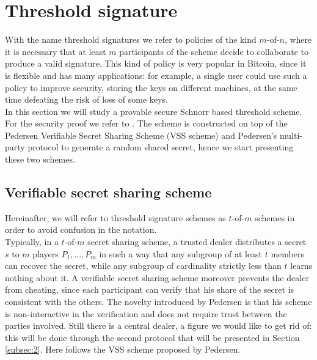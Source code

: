 \bigskip

\bigskip

\section{Threshold signature}
\label{threshold}
With the name threshold signatures we refer to policies of the kind $m$-of-$n$, where it is necessary that at least $m$ participants of the scheme decide to collaborate to produce a valid signature. This kind of policy is very popular in Bitcoin, since it is flexible and has many applications: for example, a single user could use such a policy to improve security, storing the keys on different machines, at the same time defeating the risk of loss of some keys. 
\\
In this section we will study a provable secure Schnorr based threshold scheme. For the security proof we refer to \cite{RefWork:14}. The scheme is constructed on top of the Pedersen Verifiable Secret Sharing Scheme (VSS scheme) and Pedersen's multi-party protocol to generate a random shared secret, hence we start presenting these two schemes.

\bigskip

\subsection{Verifiable secret sharing scheme}
\label{subsec:1}
Hereinafter, we will refer to threshold signature schemes as $t$-of-$m$ schemes in order to avoid confusion in the notation.
\\
Typically, in a $t$-of-$m$ secret sharing scheme, a trusted dealer distributes a secret $s$ to $m$ players $P_1, ..., P_m$ in such a way that any subgroup of at least $t$ members can recover the secret, while any subgroup of cardinality strictly less than $t$ learns nothing about it. A verifiable secret sharing scheme moreover prevents the dealer from cheating, since each participant can verify that his share of the secret is consistent with the others. The novelty introduced by Pedersen is that his scheme is non-interactive in the verification and does not require trust between the parties involved. Still there is a central dealer, a figure we would like to get rid of: this will be done through the second protocol that will be presented in Section \ref{subsec:2}. Here follows the VSS scheme proposed by Pedersen.

